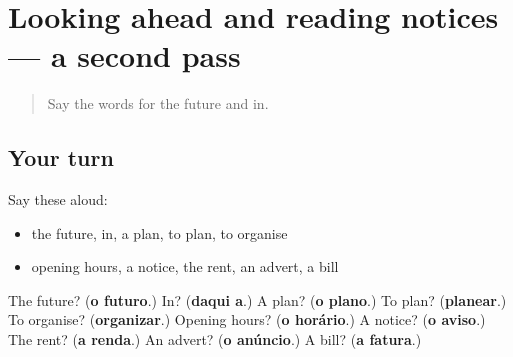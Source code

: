 \section[(dialogue)]{Looking ahead and reading notices — a second pass}

\label{lesson:PT-R137-second-pass-looking-ahead-and-reading-notices}



\begin{quote}
Say the words for the future and in.
\end{quote}

\subsection*{Your turn}
Say these aloud:

\begin{itemize}
\raggedright
  \item the future, in, a plan, to plan, to organise
  \item opening hours, a notice, the rent, an advert, a bill
\end{itemize}

\begin{tcolorbox}[breakable,colback=teal!4,colframe=teal!35!black,title={Before you move on}]
The future? (\textbf{o futuro}.) In? (\textbf{daqui a}.) A plan? (\textbf{o plano}.) To plan? (\textbf{planear}.) To organise? (\textbf{organizar}.) Opening hours? (\textbf{o horário}.) A notice? (\textbf{o aviso}.) The rent? (\textbf{a renda}.) An advert? (\textbf{o anúncio}.) A bill? (\textbf{a fatura}.)
\end{tcolorbox}
